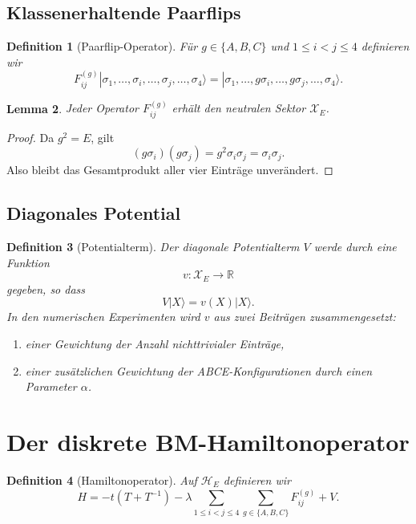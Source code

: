 \documentclass[11pt,a4paper]{article}
\newtheorem{definition}{Definition}[section]
\newtheorem{lemma}[definition]{Lemma}
\newcommand{\X}{\mathcal X}
\newcommand{\HE}{\mathcal H_E}
\begin{document}
	\subsection{Klassenerhaltende Paarflips}
	
	\begin{definition}[Paarflip-Operator]
		Für \(g\in\{A,B,C\}\) und \(1\le i<j\le 4\) definieren wir
		\[
		F_{ij}^{(g)}
		|\sigma_1,\dots,\sigma_i,\dots,\sigma_j,\dots,\sigma_4\rangle
		=
		|\sigma_1,\dots,g\sigma_i,\dots,g\sigma_j,\dots,\sigma_4\rangle.
		\]
	\end{definition}
	
	\begin{lemma}
		Jeder Operator \(F_{ij}^{(g)}\) erhält den neutralen Sektor \(\X_E\).
	\end{lemma}
	
	\begin{proof}
		Da \(g^2=E\), gilt
		\[
		(g\sigma_i)(g\sigma_j)=g^2\sigma_i\sigma_j=\sigma_i\sigma_j.
		\]
		Also bleibt das Gesamtprodukt aller vier Einträge unverändert.
	\end{proof}
	
	\subsection{Diagonales Potential}
	
	\begin{definition}[Potentialterm]
		Der diagonale Potentialterm \(V\) werde durch eine Funktion
		\[
		v:\X_E\to\mathbb R
		\]
		gegeben, so dass
		\[
		V|X\rangle=v(X)|X\rangle.
		\]
		In den numerischen Experimenten wird \(v\) aus zwei Beiträgen zusammengesetzt:
		\begin{enumerate}[label=(\alph*)]
			\item einer Gewichtung der Anzahl nichttrivialer Einträge,
			\item einer zusätzlichen Gewichtung der ABCE-Konfigurationen durch einen Parameter \(\alpha\).
		\end{enumerate}
	\end{definition}
	
	\section{Der diskrete BM-Hamiltonoperator}
	
	\begin{definition}[Hamiltonoperator]
		Auf \(\HE\) definieren wir
		\[
		H
		=
		-t(T+T^{-1})
		-\lambda \sum_{1\le i<j\le 4}\sum_{g\in\{A,B,C\}}F_{ij}^{(g)}
		+V.
		\]
	\end{definition}
	
\end{document}
